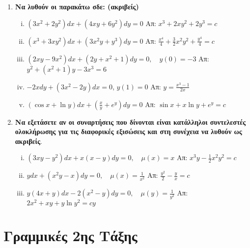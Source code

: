 \documentclass[a4paper,table]{report}
\begin{document}
\begin{enumerate}
  \item {\bfseries Να λυθούν οι παρακάτω σδε: (ακριβείς)}
    \begin{enumerate}[i)]
      \item $ (3x^{2}+2y^{2})dx+(4xy+6y^{2})dy=0  $ 
        \hfill Απ: $ x^{3}+2xy^{2}+2y^{3}=c $ 
      \item $ (x^{3}+3xy^{2})dx+(3x^{2}y+y^{3})dy = 0 $
        \hfill Απ: $ \frac{x^{4}}{4}+\frac{3}{2} x^{2}y^{2}+\frac{y^{4}}{4} = c $ 
      \item $ (2xy-9x^{2})dx+(2y+x^{2}+1)dy=0, \quad y(0)=-3 $ 
        \hfill Απ: $y^{2} +(x^{2}+1)y-3x^{3}=6 $ 
      \item $ -2xdy + (3x^{2}-2y)dx=0 $, \quad $ y(1)=0 $ 
        \hfill Απ: $ y= \frac{x^{3}-1}{2x} $ 
      \item $ (\cos{x} + \ln{y})dx + \left(\frac{x}{y} + e^{y}\right)dy=0 $ 
        \hfill Απ: $ \sin{x} + x \ln{y} + e^{y}=c $ 
    \end{enumerate}

  \item {\bfseries Να εξετάσετε αν οι συναρτήσεις που δίνονται είναι κατάλληλοι 
      συντελεστές ολοκλήρωσης για τις διαφορικές εξισώσεις και στη συνέχεια να λυθούν ως 
    ακριβείς}.
    \begin{enumerate}[i)]
      \item $(3xy-y^{2})dx+x(x-y)dy=0, \quad \mu(x)=x $ 
        \hfill Απ: $x^{3}y- \frac{1}{2} x^{2}y^{2}=c $ 
      \item $ ydx+(x^{2}y-x)dy=0, \quad \mu (x) = \frac{1}{x^{2}} $ 
        \hfill Απ: $ \frac{y^{2}}{2} - \frac{y}{x} = c $ 
      \item $ y(4x+y)dx-2(x^{2}-y)dy=0, \quad \mu(y)= \frac{1}{y^{2}} $ 
        \hfill Απ: $ 2x^{2}+xy+ y \ln{y^{2}} =cy$ 
    \end{enumerate}
\end{enumerate}


\section*{Γραμμικές 2ης Τάξης}
\end{document}
